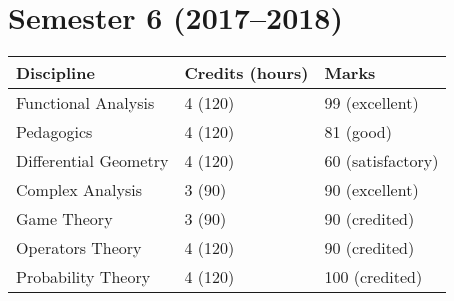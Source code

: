 \documentclass[10pt]{extarticle}
\begin{document}

\section*{Semester 6 (2017--2018)}

\begin{tabularx}{\textwidth}{ | X | l | l | }

\hline
    \textbf{Discipline}              & \textbf{Credits (hours)} & \textbf{Marks} \\
\hline
    Functional Analysis   & 4 (120) & 99 (excellent)    \\
    Pedagogics            & 4 (120) & 81 (good)         \\
    Differential Geometry & 4 (120) & 60 (satisfactory) \\
    Complex Analysis      & 3 (90)  & 90 (excellent)    \\
\hline
    Game Theory        & 3 (90)  & 90  (credited) \\
    Operators Theory   & 4 (120) & 90 (credited)  \\
    Probability Theory & 4 (120) & 100 (credited) \\
\hline

\end{tabularx}
\end{document}

